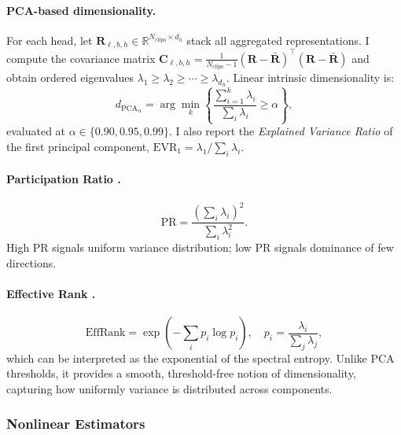 \paragraph{PCA-based dimensionality.}
For each head, let $\mathbf{R}_{\ell,b,h} \in \mathbb{R}^{N_{\text{clips}} \times d_h}$ stack all aggregated
representations. I compute the covariance matrix $\mathbf{C}_{\ell,b,h} =
\tfrac{1}{N_{\text{clips}}-1}(\mathbf{R} - \bar{\mathbf{R}})^\top(\mathbf{R} - \bar{\mathbf{R}})$ and obtain ordered eigenvalues $\lambda_1 \geq \lambda_2
\geq \cdots \geq \lambda_{d_h}$. Linear intrinsic dimensionality is:
\begin{equation}
    d_{\mathrm{PCA}}_{\alpha}
    = \arg\min_{k}\left\{
        \frac{\sum_{i=1}^{k}\lambda_i}{\sum_{i}\lambda_i} \geq \alpha
      \right\},
    \label{eq:pca_dim}
\end{equation}
evaluated at $\alpha \in \{0.90, 0.95, 0.99\}$. I also report the \emph{Explained Variance Ratio}
of the first principal component, $\mathrm{EVR}_1 = \lambda_1 / \sum_i \lambda_i$.

\paragraph{Participation Ratio \cite{pr}.}
\begin{equation}
    \mathrm{PR}
    = \frac{\left(\sum_{i}\lambda_i\right)^2}{\sum_{i}\lambda_i^2}.
    \label{eq:pr}
\end{equation}
High PR signals uniform variance distribution; low PR signals dominance of few directions.

\paragraph{Effective Rank \cite{er}.}
\begin{equation}
    \mathrm{EffRank} = \exp\!\left(-\sum_{i} p_i \log p_i\right),
    \quad p_i = \frac{\lambda_i}{\sum_j \lambda_j},
    \label{eq:effrank}
\end{equation}
which can be interpreted as the exponential of the spectral entropy. Unlike PCA thresholds, it
provides a smooth, threshold-free notion of dimensionality, capturing how uniformly variance is
distributed across components.

\subsubsection{Nonlinear Estimators}

